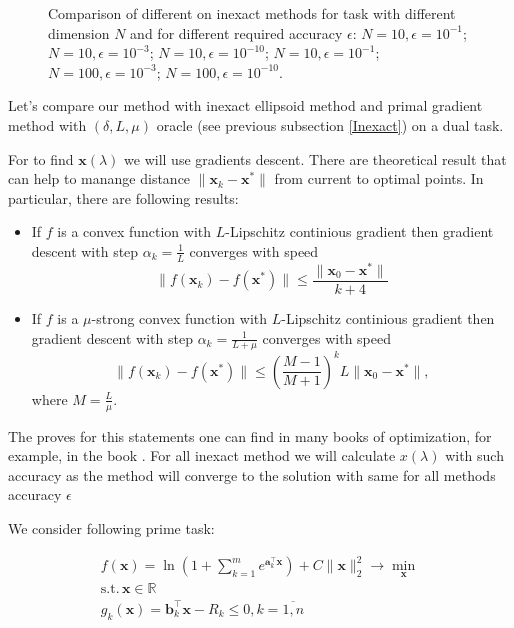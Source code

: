 \documentclass[12pt]{article}
\begin{document}
\begin{figure}[ht!]
\hspace{2ex}
\caption{Comparison of different on inexact methods for task with different dimension $N$ and for different required accuracy $\epsilon$:  $N=10,\epsilon=10^{-1}$;  $N=10,\epsilon=10^{-3}$;  $N=10,\epsilon=10^{-10}$;  $N=10,\epsilon=10^{-1}$;  $N=100,\epsilon=10^{-3}$;  $N=100,\epsilon=10^{-10}$. } \label{fig:image}
\end{figure}

Let's compare our method with inexact ellipsoid method and primal gradient method with $(\delta, L,\mu)$ oracle (see previous subsection \ref{Inexact}) on a dual task.

For to find $\textbf{x}(\lambda)$ we will use gradients descent. There are theoretical result that can help to manange distance $\|\textbf{x}_k-\textbf{x}^*\|$ from current to optimal points. In particular, there are following results:
\begin{itemize}
\item If $f$ is a convex function with $L$-Lipschitz continious gradient then gradient descent with step $\alpha_k = \frac{1}{L}$ converges with speed
$$\|f(\textbf{x}_k)-f(\textbf{x}^*)\|\leq \frac{\|\textbf{x}_0-\textbf{x}^*\|}{k+4}$$
\item If $f$ is a $\mu$-strong convex function with $L$-Lipschitz continious gradient then gradient descent with step $\alpha_k = \frac{1}{L+\mu}$ converges with speed
$$\|f(\textbf{x}_k)-f(\textbf{x}^*)\|\leq \left(\frac{M-1}{M+1}\right)^kL\|\textbf{x}_0-\textbf{x}^*\|,$$
where $M =\frac{L}{\mu}$.
\end{itemize}
The proves for this statements one can find in many books of optimization, for example, in the book \cite{Polyak}. For all inexact method we will calculate $x(\lambda)$ with such accuracy as the method will converge to the solution with same for all methods accuracy $\epsilon$

We consider following prime task:

\begin{gather}
\label{prime}
f(\textbf{x}) = \ln \left(1+\sum_{k=1}^me^{\textbf{a}_k^\top\textbf{x}}\right) + C\|\textbf{x}\|_2^2\rightarrow \min\limits_{\textbf{x}}\\
\text{s.t.}\,\textbf{x}\in \mathbb{R}\\
g_k(\textbf{x}) = \textbf{b}_k^\top\textbf{x}-R_k\leq0, k = \overline{1,n}\\
\end{gather}
\end{document}
